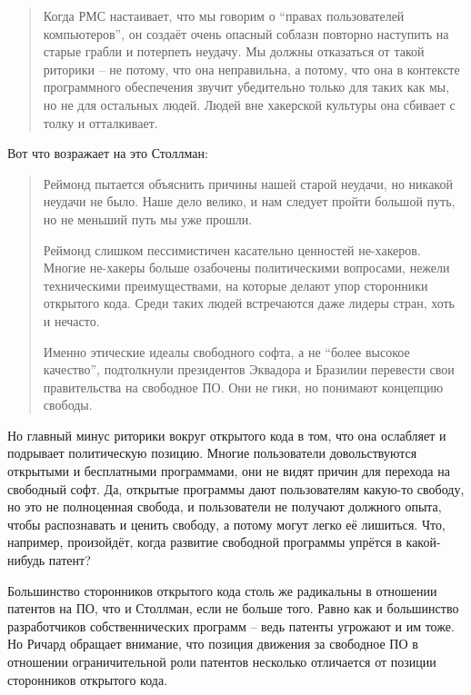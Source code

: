 \begin{quote}
Когда РМС настаивает, что мы говорим о \enquote{правах пользователей компьютеров}, он создаёт очень опасный соблазн повторно наступить на старые грабли и потерпеть неудачу. Мы должны отказаться от такой риторики -- не потому, что она неправильна, а потому, что она в контексте программного обеспечения звучит убедительно только для таких как мы, но не для остальных людей. Людей вне хакерской культуры она сбивает с толку и отталкивает.
\end{quote}

Вот что возражает на это Столлман:

\begin{quote}
Реймонд пытается объяснить причины нашей старой неудачи, но никакой неудачи не было. Наше дело велико, и нам следует пройти большой путь, но не меньший путь мы уже прошли.

Реймонд слишком пессимистичен касательно ценностей не-хакеров. Многие не-хакеры больше озабочены политическими вопросами, нежели техническими преимуществами, на которые делают упор сторонники открытого кода. Среди таких людей встречаются даже лидеры стран, хоть и нечасто.

Именно этические идеалы свободного софта, а не \enquote{более высокое качество}, подтолкнули президентов Эквадора и Бразилии перевести свои правительства на свободное ПО. Они не гики, но понимают концепцию свободы.
\end{quote}

Но главный минус риторики вокруг открытого кода в том, что она ослабляет и подрывает политическую позицию. Многие пользователи довольствуются открытыми и бесплатными программами, они не видят причин для перехода на свободный софт. Да, открытые программы дают пользователям какую-то свободу, но это не полноценная свобода, и пользователи не получают должного опыта, чтобы распознавать и ценить свободу, а потому могут легко её лишиться. Что, например, произойдёт, когда развитие свободной программы упрётся в какой-нибудь патент?

Большинство сторонников открытого кода столь же радикальны в отношении патентов на ПО, что и Столлман, если не больше того. Равно как и большинство разработчиков собственнических программ -- ведь патенты угрожают и им тоже. Но Ричард обращает внимание, что позиция движения за свободное ПО в отношении ограничительной роли патентов несколько отличается от позиции сторонников открытого кода.

